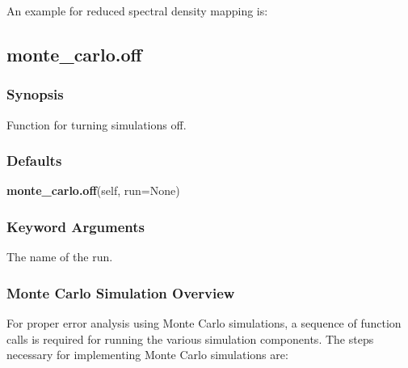 

An example for reduced spectral density mapping is:








\newpage

\subsection{monte\_carlo.off}


\subsubsection{Synopsis}

Function for turning simulations off.

\subsubsection{Defaults}

\textsf{\textbf{monte\_carlo.off}(self, run=None)}


\subsubsection{Keyword Arguments}


  The name of the run.


\subsubsection{Monte Carlo Simulation Overview}

For proper error analysis using Monte Carlo simulations, a sequence of function calls is
required for running the various simulation components.  The steps necessary for
implementing Monte Carlo simulations are:

